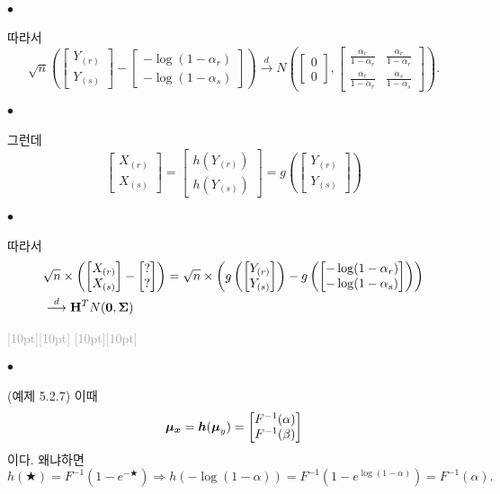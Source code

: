 \documentclass[12pt,oneside,english]{book}
\newcommand{\rdash}{\noindent \textcolor{darkgray}{ \raisebox{-1.9pt}[10pt][10pt]{\leafright} \hrulefill \raisebox{-1.9pt}[10pt][10pt]{\leafright \decofourleft \decothreeleft  \aldineright \decotwo \floweroneleft \decoone}}}
\def\ck{\paragraph{\Large$\bullet$}\Large}
\newcommand{\bs}[1]{\mbox{\boldmath $#1$}}
\newcommand{\bfH}{\mbox{$\bf{H}$}}
\begin{document}
\ck 따라서 
\[
\sqrt{n}\left(\begin{bmatrix}Y_{(r)} \\ Y_{(s)}\end{bmatrix}-\begin{bmatrix}-\log(1-\alpha_r) \\ -\log(1-\alpha_s)\end{bmatrix}\right)\overset{d}{\to} N\left(\begin{bmatrix}0\\0\end{bmatrix},\begin{bmatrix} \frac{\alpha_r}{1-\alpha_r} & \frac{\alpha_r}{1-\alpha_r} \\ \frac{\alpha_r}{1-\alpha_r} & \frac{\alpha_s}{1-\alpha_s} \end{bmatrix}\right).
\]


\ck 그런데 
\[
\begin{bmatrix} X_{(r)}\\ X_{(s)} \end{bmatrix}=\begin{bmatrix} h(Y_{(r)})\\  h(Y_{(s)}) \end{bmatrix}=g\left(\begin{bmatrix}Y_{(r)} \\ Y_{(s)}\end{bmatrix}\right)
\]

\ck 따라서 
\begin{align*}
& \sqrt{n}\times\left(\begin{bmatrix}X_{(r)} \\ X_{(s)}\end{bmatrix}-\begin{bmatrix}? \\ ? \end{bmatrix}\right) 
=\sqrt{n}\times\left(g\left(\begin{bmatrix}Y_{(r)} \\ Y_{(s)}\end{bmatrix}\right)-g\left(\begin{bmatrix} -\log(1-\alpha_r) \\ -\log(1-\alpha_s) \end{bmatrix}\right)\right) \\
& \overset{d}{\longrightarrow} \bfH^T N({\bs 0},{\bs \Sigma})
\end{align*}

\rdash

\ck (예제 5.2.7) 이때 
\[
\bs{\mu_x}=\bs{h}(\bs{\mu}_y)=\begin{bmatrix} F^{-1}(\alpha)\\ F^{-1}(\beta) \end{bmatrix}
\]
이다. 왜냐하면 
\[
h(\bigstar)=F^{-1}(1-e^{-\bigstar}) \Longrightarrow h(-\log(1-\alpha))=F^{-1}(1-e^{\log(1-\alpha)})=F^{-1}(\alpha).
\]
\end{document}
